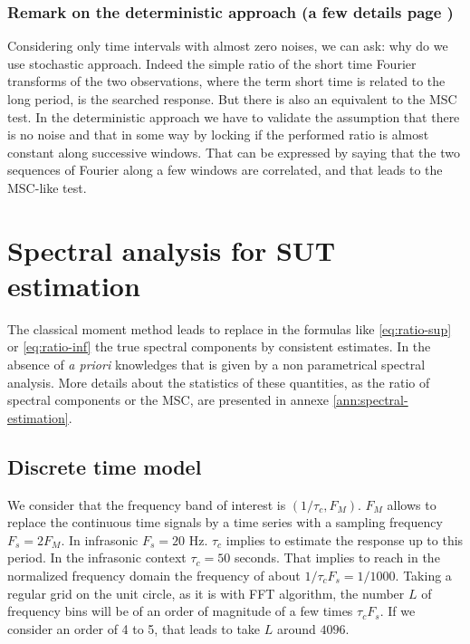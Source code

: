 \subsubsection{Remark on the deterministic approach (a few details page \pageref{ann:deterministic-approach})}
Considering only time intervals with almost zero noises, we can ask: why do we use stochastic approach. Indeed the simple ratio of the short time Fourier transforms of the two observations, where the term short time is related to the long period, is the searched response. But there is also an equivalent to the MSC test. In the deterministic approach we have to validate the assumption that there is no noise and that in some way by locking if the performed ratio is almost constant along successive windows. That can be expressed by saying that the two sequences of Fourier along a few windows are correlated, and that leads to the MSC-like test.

\section{Spectral analysis for SUT estimation}
The classical moment method leads to replace in the  formulas like \eqref{eq:ratio-sup}  or \eqref{eq:ratio-inf} the true spectral components by consistent estimates. In the absence of {\it a priori} knowledges that is given by a non parametrical spectral analysis. More details about the statistics of these quantities, as  the ratio of spectral components or the MSC, are presented in annexe \ref{ann:spectral-estimation}. 


\subsection{Discrete time model}
We consider that the frequency band of interest is $(1/\tau_{c}, F_{M})$. $F_{M}$ allows to replace the continuous time signals by a time series with a sampling frequency $F_{s}=2F_{M}$. In infrasonic $F_{s}=20$ Hz. $\tau_{c}$ implies to estimate the response up to this period. In the infrasonic context $\tau_{c}=50$ seconds. That implies to reach in the normalized frequency domain the frequency of about $1/\tau_{c}F_{s}=1/1000$. Taking a regular grid on the unit circle, as it is with FFT algorithm, the number $L$ of frequency bins will be of an order of magnitude of a few times $\tau_{c}F_{s}$. If we consider an order of 4 to 5, that leads to take $L$ around $4096$.

